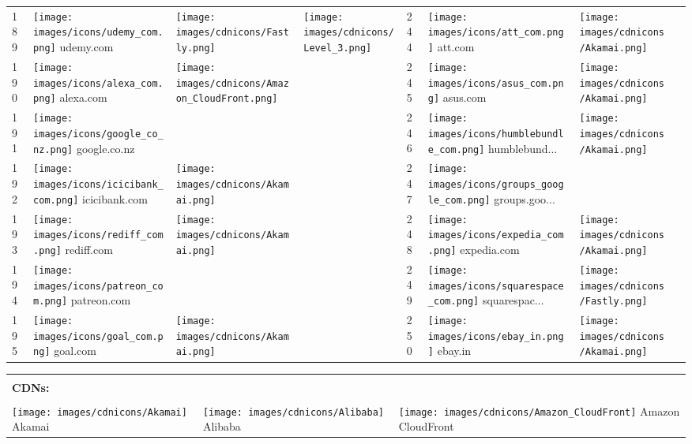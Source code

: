\begin{table}[tbp]
\begin{tabular}{|llll|llll|}
189 & \texttt{[image: images/icons/udemy\_com.png]} udemy.com & \texttt{[image: images/cdnicons/Fastly.png]} & \texttt{[image: images/cdnicons/Level\_3.png]} & 244 & \texttt{[image: images/icons/att\_com.png]} att.com & \texttt{[image: images/cdnicons/Akamai.png]} & \\
190 & \texttt{[image: images/icons/alexa\_com.png]} alexa.com & \texttt{[image: images/cdnicons/Amazon\_CloudFront.png]} & & 245 & \texttt{[image: images/icons/asus\_com.png]} asus.com & \texttt{[image: images/cdnicons/Akamai.png]} & \\
191 & \texttt{[image: images/icons/google\_co\_nz.png]} google.co.nz & & & 246 & \texttt{[image: images/icons/humblebundle\_com.png]} humblebund... & \texttt{[image: images/cdnicons/Akamai.png]} & \\
192 & \texttt{[image: images/icons/icicibank\_com.png]} icicibank.com & \texttt{[image: images/cdnicons/Akamai.png]} & & 247 & \texttt{[image: images/icons/groups\_google\_com.png]} groups.goo... & & \\
193 & \texttt{[image: images/icons/rediff\_com.png]} rediff.com & \texttt{[image: images/cdnicons/Akamai.png]} & & 248 & \texttt{[image: images/icons/expedia\_com.png]} expedia.com & \texttt{[image: images/cdnicons/Akamai.png]} & \\
194 & \texttt{[image: images/icons/patreon\_com.png]} patreon.com & & & 249 & \texttt{[image: images/icons/squarespace\_com.png]} squarespac... & \texttt{[image: images/cdnicons/Fastly.png]} & \\
195 & \texttt{[image: images/icons/goal\_com.png]} goal.com & \texttt{[image: images/cdnicons/Akamai.png]} & & 250 & \texttt{[image: images/icons/ebay\_in.png]} ebay.in & \texttt{[image: images/cdnicons/Akamai.png]} & \\
\hline
\end{tabular}
\begin{tabular}{|lll|}
&& \\
\textbf{CDNs:} && \\
&& \\
\texttt{[image: images/cdnicons/Akamai]} Akamai &
\texttt{[image: images/cdnicons/Alibaba]} Alibaba &
\texttt{[image: images/cdnicons/Amazon\_CloudFront]} Amazon CloudFront \\

\end{tabular}
\end{table}
